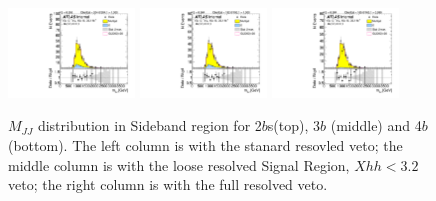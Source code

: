 \begin{figure}[htbp!]
\begin{center}
\includegraphics[angle=270, width=0.3\textwidth]{./figures/boosted/AppendixResveto/Moriond_FourTag_Sideband_mHH_l.pdf}
\includegraphics[angle=270, width=0.3\textwidth]{./figures/boosted/AppendixResveto/Moriond_resveto_FourTag_Sideband_mHH_l.pdf}
\includegraphics[angle=270, width=0.3\textwidth]{./figures/boosted/AppendixResveto/Moriond_fullresveto_FourTag_Sideband_mHH_l.pdf}\\
  \caption{ $M_{JJ}$ distribution in Sideband region for 2$b$s(top), 3$b$ (middle) and 4$b$ (bottom). The left column is with the stanard resovled veto; the middle column is with the loose resolved Signal Region, $Xhh < 3.2$ veto; the right column is with the full resolved veto.}
\label{fig:app-resveto-sb}
\end{center}
\end{figure}

